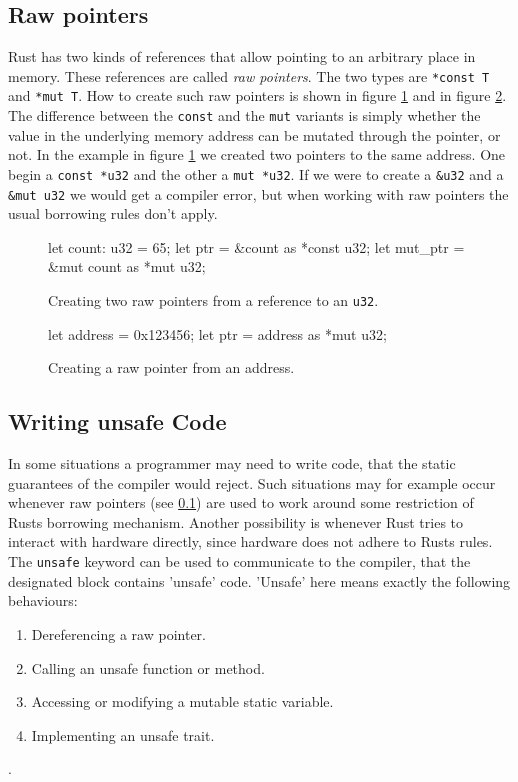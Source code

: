 \documentclass[twocolumn]{article}
\begin{document}
\subsection{Raw pointers}
\label{raw-pointer}
Rust has two kinds of references that allow pointing to an arbitrary place in memory.
These references are called \textit{raw pointers}.
The two types are \texttt{*const T} and \texttt{*mut T}.
How to create such raw pointers is shown in figure \ref{raw-pointer-new} and in figure \ref{raw-pointer-new2}.
The difference between the \texttt{const} and the \texttt{mut} variants is simply whether the value in the underlying memory address can be mutated through the pointer, or not.
In the example in figure \ref{raw-pointer-new} we created two pointers to the same address.
One begin a \texttt{const *u32} and the other a \texttt{mut *u32}.
If we were to create a \texttt{&u32} and a \texttt{&mut u32} we would get a compiler error, but when working with raw pointers the usual borrowing rules don't apply.
\begin{figure}
\begin{rustcode}
let count: u32 = 65;
let ptr = &count as *const u32;
let mut_ptr = &mut count as *mut u32;
\end{rustcode}
\vspace{-2em}
\caption{Creating two raw pointers from a reference to an \texttt{u32}.}
\label{raw-pointer-new}
\end{figure}
\begin{figure}
\begin{rustcode}
let address = 0x123456;
let ptr = address as *mut u32;
\end{rustcode}
\vspace{-2em}
\caption{Creating a raw pointer from an address.}
\label{raw-pointer-new2}
\end{figure}
\subsection{Writing unsafe Code}
\label{unsafe}
In some situations a programmer may need to write code, that the static guarantees of the compiler would reject.
Such situations may for example occur whenever raw pointers (see \ref{raw-pointer}) are used to work around some restriction of Rusts borrowing mechanism.
Another possibility is whenever Rust tries to interact with hardware directly, since hardware does not adhere to Rusts rules.
The \texttt{unsafe} keyword can be used to communicate to the compiler, that the designated block contains 'unsafe' code.
'Unsafe' here means exactly the following behaviours:
\begin{enumerate}
        \item Dereferencing a raw pointer.
        \item Calling an unsafe function or method.
        \item Accessing or modifying a mutable static variable.
        \item Implementing an unsafe trait.
\end{enumerate}
\cite{RustBook-Unsafe}.
\end{document}
